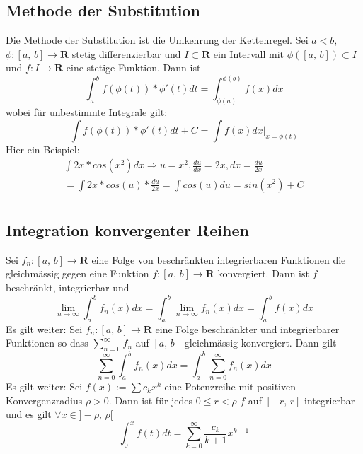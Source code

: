 \documentclass[8pt]{article}
\begin{document}
\begin{multicols*}{3}
\subsection{Methode der Substitution}

Die Methode der Substitution ist die Umkehrung der Kettenregel. Sei $a < b$, $\phi:[a,\,b] \rightarrow \mathbf{R}$
stetig differenzierbar und $I \subset \mathbf{R}$ ein Intervall mit $\phi([a,\,b]) \subset I$ und $f: I \rightarrow \mathbf{R}$ eine stetige Funktion.
Dann ist
$$
  \int_a^b f(\phi(t)) * \phi'(t) dt = \int_{\phi(a)}^{\phi(b)} f(x) dx
$$
wobei für unbestimmte Integrale gilt:
$$
  \int f(\phi(t)) * \phi'(t) dt + C = \int f(x) dx \Big|_{x = \phi(t)}
$$
Hier ein Beispiel:
\begin{align*}
  \int 2x * cos(x^2) dx \Rightarrow u = x^2, \frac{du}{dx} = 2x, dx = \frac{du}{2x}\\
  = \int 2x * cos(u) * \frac{du}{2x} = \int cos(u) du = sin(x^2) + C\\
\end{align*}

\subsection{Integration konvergenter Reihen}

Sei $f_n:[a,\,b] \rightarrow \mathbf{R}$ eine Folge von beschränkten integrierbaren
Funktionen die gleichmässig gegen eine Funktion $f:[a,\,b] \rightarrow \mathbf{R}$ konvergiert.
Dann ist $f$ beschränkt, integrierbar und
$$
  \lim_{n \rightarrow \infty} \int_a^b f_n(x) dx = \int_a^b \lim_{n \rightarrow \infty} f_n(x) dx = \int_a^b f(x) dx
$$
Es gilt weiter: Sei $f_n:[a,\,b] \rightarrow \mathbf{R}$ eine Folge beschränkter und integrierbarer Funktionen so dass $\sum_{n = 0}^\infty f_n$ auf $[a,\,b]$
gleichmässig konvergiert. Dann gilt
$$
  \sum_{n = 0}^\infty \int_a^b f_n(x) dx = \int_a^b \sum_{n = 0}^\infty f_n(x) dx
$$
Es gilt weiter: Sei $f(x) := \sum c_k x^k$ eine Potenzreihe mit positiven Konvergenzradius $\rho > 0$.
Dann ist für jedes $0 \leq r < \rho$ $f$ auf $[-r,\,r]$ integrierbar und es gilt $\forall x \in ]-\rho,\,\rho[$
$$
  \int_0^x f(t) dt = \sum_{k = 0}^\infty \frac{c_k}{k+1} x^{k+1}
$$
%
%


\end{multicols*}
\end{document}
